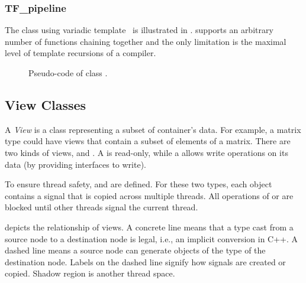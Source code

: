 
\subsubsection{TF\_pipeline}
The  class using variadic template~\cite{vartemp} is
illustrated in .  supports an arbitrary
number of functions chaining together and the only limitation is the maximal
level of template recursions of a compiler.


\begin{figure}[hbt]
  \caption{Pseudo-code of class .}
  \label{fig:pipeline:code}
\end{figure}


\subsection{View Classes}
\label{sec:view}

A \emph{View} is a class representing a subset of container's data. For example,
a matrix type could have views that contain a subset of elements of a matrix.
There are two kinds of views,  and .
A  is read-only, while a  allows write operations on its data
(by providing interfaces to write). 

To ensure thread safety,  and  are
defined. For these two types, each object contains a signal that is copied across multiple
threads. All operations of  or  are blocked until
other threads signal the current thread.

 depicts the relationship of views. A concrete line means that
a type cast from a source node to a destination node is legal, i.e., an implicit
conversion in C++.  A dashed line means a source node can generate objects of
the type of the destination node. Labels on the dashed line signify how
signals are created or copied.
Shadow region is another thread space.

